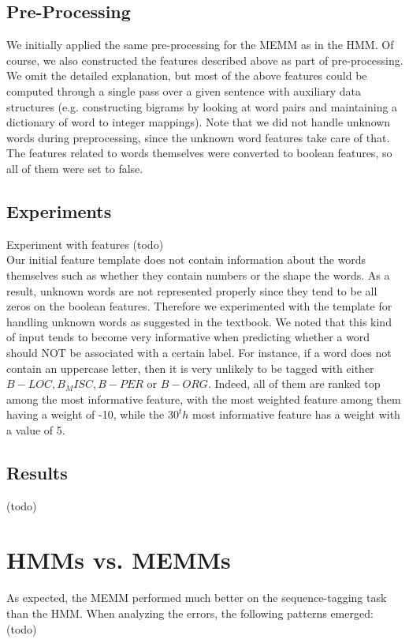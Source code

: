 \documentclass[12pt]{article}
\begin{document}
\subsection{Pre-Processing}
We initially applied the same pre-processing for the MEMM as in the HMM. Of course, we also constructed the features described above as part of pre-processing. We omit the detailed explanation, but most of the above features could be computed through a single pass over a given sentence with auxiliary data structures (e.g. constructing bigrams by looking at word pairs and maintaining a dictionary of word to integer mappings). Note that we did not handle unknown words during preprocessing, since the unknown word features take care of that. The features related to words themselves were converted to boolean features, so all of them were set to false.    
\subsection{Experiments}
Experiment with features (todo)\\
Our initial feature template does not contain information about the words themselves such as whether they contain numbers or the shape the words. As a result, unknown words are not represented properly since they tend to be all zeros on the boolean features. Therefore we experimented with the template for handling unknown words as suggested in the textbook. We noted that this kind of input tends to become very informative when predicting whether a word should NOT be associated with a certain label. For instance, if a word does not contain an uppercase letter, then it is very unlikely to be tagged with either $B-LOC, B_MISC, B-PER$ or $B-ORG$. Indeed, all of them are ranked top among the most informative feature, with the most weighted feature among them having a weight of -10, while the $30^th$ most informative feature has a weight with a value of 5. 
\subsection{Results}
(todo)
\section{HMMs vs. MEMMs}
As expected, the MEMM performed much better on the sequence-tagging task than the HMM. When analyzing the errors, the following patterns emerged: (todo)
\end{document}

